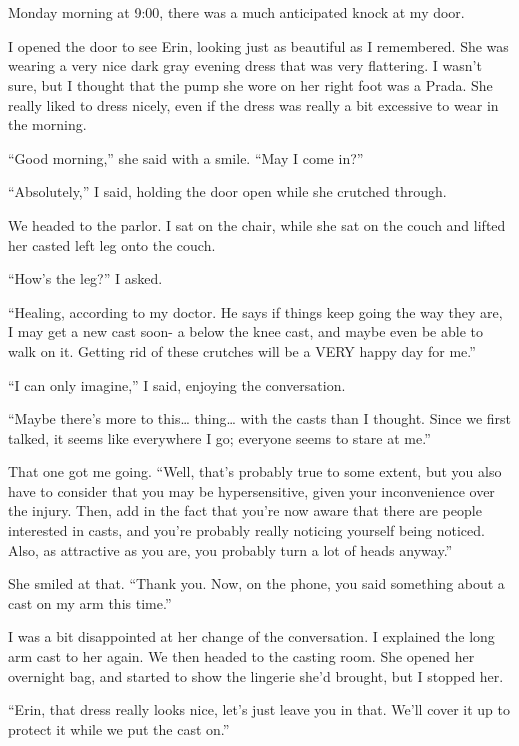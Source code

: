 \chapter{}
Monday morning at 9:00, there was a much anticipated knock at my door.

I opened the door to see Erin, looking just as beautiful as I remembered. She was wearing a
very nice dark gray evening dress that was very flattering. I wasn't sure, but I thought that
the pump she wore on her right foot was a Prada. She really liked to dress nicely, even if the
dress was really a bit excessive to wear in the morning.

``Good morning,'' she said with a smile. ``May I come in?''

``Absolutely,'' I said, holding the door open while she crutched through.

We headed to the parlor. I sat on the chair, while she sat on the couch and lifted her
casted left leg onto the couch.

``How's the leg?'' I asked.

``Healing, according to my doctor. He says if things keep going the way they are, I may get
a new cast soon- a below the knee cast, and maybe even be able to walk on it. Getting rid of
these crutches will be a VERY happy day for me.''

``I can only imagine,'' I said, enjoying the conversation.

``Maybe there's more to this… thing… with the casts than I thought. Since we first talked,
it seems like everywhere I go; everyone seems to stare at me.''

That one got me going. ``Well, that's probably true to some extent, but you also have to
consider that you may be hypersensitive, given your inconvenience over the injury. Then, add in
the fact that you're now aware that there are people interested in casts, and you're probably
really noticing yourself being noticed. Also, as attractive as you are, you probably turn a lot
of heads anyway.''

She smiled at that. ``Thank you. Now, on the phone, you said something about a cast on my
arm this time.''

I was a bit disappointed at her change of the conversation. I explained the long arm cast to
her again. We then headed to the casting room. She opened her overnight bag, and started to show
the lingerie she'd brought, but I stopped her.

``Erin, that dress really looks nice, let's just leave you in that. We'll cover it up to
protect it while we put the cast on.''

